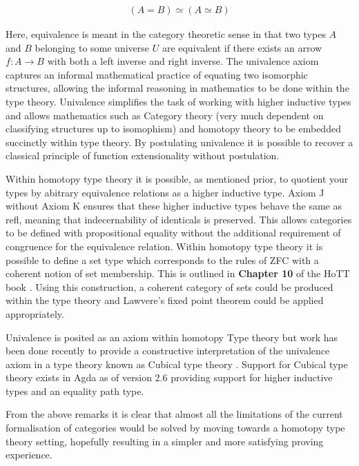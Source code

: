 \begin{align*}
    (A = B) \simeq (A \simeq B)
\end{align*}

Here, equivalence is meant in the category theoretic sense in that
two types $A$ and $B$ belonging to some universe $U$ are equivalent if there
exists an arrow $f : A \rightarrow B$ with both a left inverse and right
inverse. The univalence axiom captures an informal mathematical practice of
equating two isomorphic structures, allowing the informal reasoning in
mathematics to be done within the type theory. Univalence simplifies the task of
working with higher inductive types and allows mathematics such as Category
theory (very much dependent on classifying structures up to isomophism) and
homotopy theory to be embedded succinctly within type theory. By postulating
univalence it is possible to recover a classical principle of function
extensionality without postulation.

Within homotopy type theory it is possible, as mentioned prior, to quotient your
types by abitrary equivalence relations as a higher inductive type.
\textsf{Axiom J} without \textsf{Axiom K} ensures that these higher inductive
types behave the same as \textsf{refl}, meaning that indecernability of identicals
is preserved. This allows categories to be defined with propositional equality
without the additional requirement of congruence for the equivalence relation.
Within homotopy type theory it is possible to define a set type which
corresponds to the rules of ZFC with a coherent notion of set membership. This
is outlined in \textbf{Chapter 10} of the HoTT book \cite{hottbook} . Using this construction, a coherent category of sets
could be produced within the type theory and Lawvere's fixed point theorem could
be applied appropriately.

Univalence is posited as an axiom within homotopy Type theory but work has been
done recently to provide a constructive interpretation of the univalence axiom
in a type theory known as Cubical type theory \cite{cohen2016cubical}.  Support for Cubical type theory exists in Agda as of version
2.6 providing support for higher inductive types and an equality path type.

From the above remarks it is clear that almost all the limitations of the
current formalisation of categories would be solved by moving towards a homotopy
type theory setting, hopefully resulting in a simpler and more satisfying
proving experience.
